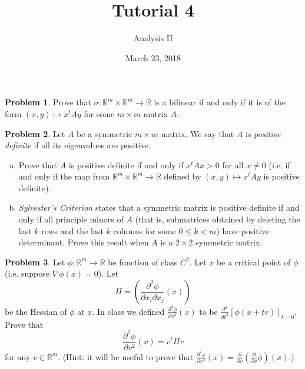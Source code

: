 \documentclass{amsart}
\newcommand{\+}[1]{\ensuremath{\mathbf{#1}}}
\newcommand{\R}{{\mathbb R}}
\theoremstyle{definition}
\newtheorem{prob}{Problem}
\begin{document}
\title{Tutorial 4}
\date{March 23, 2018}
\author{Analysis II}

\maketitle

\begin{prob}
Prove that $\sigma: \R^m \times \R^m \to \R$ is a bilinear
if and only if it is of the form $(x,y) \mapsto x^t A y$
for some $m \times m$ matrix $A$.
\end{prob}


\begin{prob}
Let $A$ be a symmetric $m \times m$ matrix.
We say that $A$ is \emph{positive definite} if 
 all its eigenvalues are positive.
 \begin{enumerate}[(a)]
\item Prove that $A$ is positive definite if and only if $x^t A x > 0$ for all $x \neq 0$
 (i.e. if and only if the map from $\R^m \times \R^m \to \R$ defined by $(x,y) \mapsto x^t A y$ is positive definite).
\item 
\emph{Sylvester's Criterion} states that a symmetric matrix is positive definite if and only if
all principle minors of $A$ (that is, submatrices obtained by deleting the last $k$ rows and the last $k$ columns for some $0 \leq k < m$) 
have positive determinant.
Prove this result when $A$ is a $2 \times 2$ symmetric matrix.
\end{enumerate}
\end{prob}

\begin{prob}
 Let $\phi: \R^m \to \R$ be function of class $C^2$.
 Let $x$ be a critical point of $\phi$ (i.e. suppose $\nabla \phi (x) = 0$).
 Let \[H = \left(\frac{\partial^2\phi}{\partial{x_i}\partial{x_j}}(x)\right)\] be the Hessian of $\phi$ at $x$.
 In class we defined $\frac{\partial^2\phi}{\partial v^2}(x)$ to be $\frac{d^2}{dt^2}[\phi(x+tv)]_{t=0}$.
 Prove that \[\frac{\partial^2\phi}{\partial v^2}(x) = v^t H v\]
 for any $v \in \R^m$.
 (Hint: it will be useful to prove that $\frac{\partial^2\phi}{\partial v^2}(x) = \frac{\partial}{\partial v}(\frac{\partial}{\partial v}\phi)(x)$.)
\end{prob}
\end{document}
